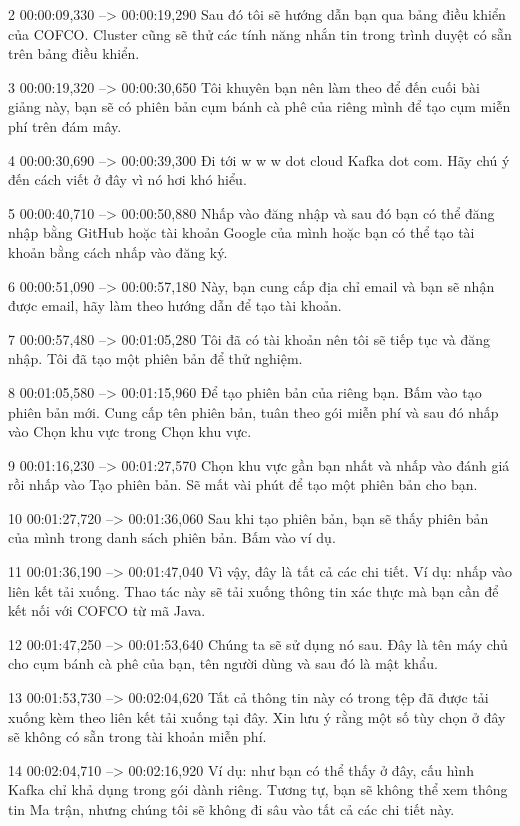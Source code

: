 2
00:00:09,330 --> 00:00:19,290
Sau đó tôi sẽ hướng dẫn bạn qua bảng điều khiển của COFCO.  Cluster cũng sẽ thử các tính năng nhắn tin trong trình duyệt có sẵn trên bảng điều khiển.

3
00:00:19,320 --> 00:00:30,650
Tôi khuyên bạn nên làm theo để đến cuối bài giảng này, bạn sẽ có phiên bản cụm bánh cà phê của riêng mình để tạo cụm miễn phí trên đám mây.

4
00:00:30,690 --> 00:00:39,300
Đi tới w w w dot cloud Kafka dot com.  Hãy chú ý đến cách viết ở đây vì nó hơi khó hiểu.

5
00:00:40,710 --> 00:00:50,880
Nhấp vào đăng nhập và sau đó bạn có thể đăng nhập bằng GitHub hoặc tài khoản Google của mình hoặc bạn có thể tạo tài khoản bằng cách nhấp vào đăng ký.

6
00:00:51,090 --> 00:00:57,180
Này, bạn cung cấp địa chỉ email và bạn sẽ nhận được email, hãy làm theo hướng dẫn để tạo tài khoản.

7
00:00:57,480 --> 00:01:05,280
Tôi đã có tài khoản nên tôi sẽ tiếp tục và đăng nhập. Tôi đã tạo một phiên bản để thử nghiệm.

8
00:01:05,580 --> 00:01:15,960
Để tạo phiên bản của riêng bạn.  Bấm vào tạo phiên bản mới.  Cung cấp tên phiên bản, tuân theo gói miễn phí và sau đó nhấp vào Chọn khu vực trong Chọn khu vực.

9
00:01:16,230 --> 00:01:27,570
Chọn khu vực gần bạn nhất và nhấp vào đánh giá rồi nhấp vào Tạo phiên bản.  Sẽ mất vài phút để tạo một phiên bản cho bạn.

10
00:01:27,720 --> 00:01:36,060
Sau khi tạo phiên bản, bạn sẽ thấy phiên bản của mình trong danh sách phiên bản.  Bấm vào ví dụ.

11
00:01:36,190 --> 00:01:47,040
Vì vậy, đây là tất cả các chi tiết.  Ví dụ: nhấp vào liên kết tải xuống.  Thao tác này sẽ tải xuống thông tin xác thực mà bạn cần để kết nối với COFCO từ mã Java.

12
00:01:47,250 --> 00:01:53,640
Chúng ta sẽ sử dụng nó sau.  Đây là tên máy chủ cho cụm bánh cà phê của bạn, tên người dùng và sau đó là mật khẩu.

13
00:01:53,730 --> 00:02:04,620
Tất cả thông tin này có trong tệp đã được tải xuống kèm theo liên kết tải xuống tại đây.  Xin lưu ý rằng một số tùy chọn ở đây sẽ không có sẵn trong tài khoản miễn phí.

14
00:02:04,710 --> 00:02:16,920
Ví dụ: như bạn có thể thấy ở đây, cấu hình Kafka chỉ khả dụng trong gói dành riêng.  Tương tự, bạn sẽ không thể xem thông tin Ma trận, nhưng chúng tôi sẽ không đi sâu vào tất cả các chi tiết này.

